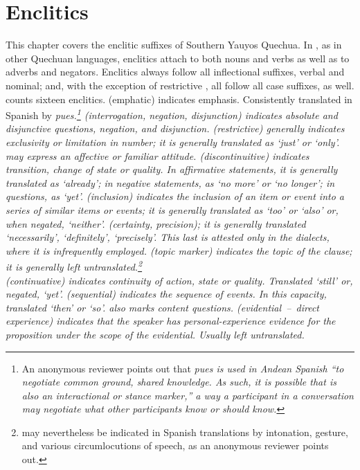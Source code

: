 \chapter{Enclitics}\label{ch:enclitics}
This chapter covers the enclitic suffixes of Southern Yauyos Quechua. In \SYQ, as in other Quechuan languages, enclitics attach to both nouns and verbs as well as to adverbs and negators. Enclitics always follow all inflectional suffixes, verbal and nominal; and, with the exception of restrictive , all follow all case suffixes, as well. \SYQ{} counts sixteen enclitics.  (emphatic) indicates emphasis. Consistently translated in Spanish by \it{pues}.\footnote{An anonymous reviewer points out that \it{pues} is used in Andean Spanish “to negotiate common ground, shared knowledge. As such, it is possible that  is also an interactional or stance marker,” a way a participant in a conversation may negotiate what other participants know or should know.}  (interrogation, negation, disjunction) indicates absolute and disjunctive questions, negation, and disjunction.  (restrictive) generally indicates exclusivity or limitation in number; it is generally translated as ‘just’ or ‘only’.  may express an affective or familiar attitude.  (discontinuitive) indicates transition, change of state or quality. In affirmative statements, it is generally translated as ‘already’; in negative statements, as ‘no more’ or ‘no longer’; in questions, as ‘yet’.  (inclusion) indicates the inclusion of an item or event into a series of similar items or events; it is generally translated as ‘too’ or ‘also’ or, when negated, ‘neither’.  (certainty, precision); it is generally translated ‘necessarily’, ‘definitely’, ‘precisely’. This last is attested only in the \QII{} dialects, where it is infrequently employed.  (topic marker) indicates the topic of the clause; it is generally left untranslated.\footnote{ may nevertheless be indicated in Spanish translations by intonation, gesture, and various circumlocutions of speech, as an anonymous reviewer points out.}\\
 (continuative) indicates continuity of action, state or quality. Translated ‘still’ or, negated, ‘yet’.  (sequential) indicates the sequence of events. In this capacity, translated ‘then’ or ‘so’.  also marks content questions.  (evidential~--~direct experience) indicates that the speaker has personal-experience evidence for the proposition under the scope of the evidential. Usually left untranslated.\\
